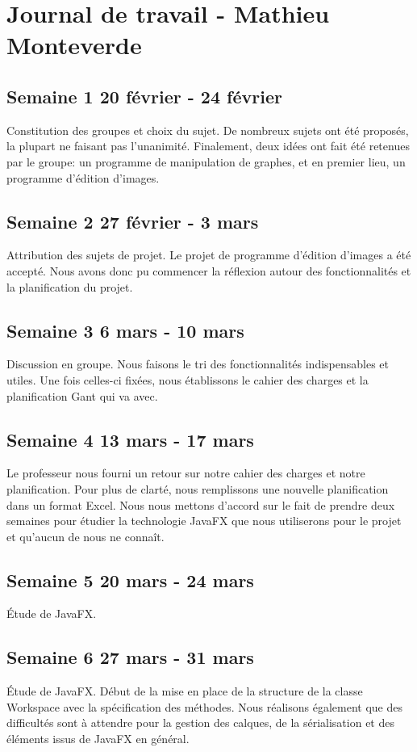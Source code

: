 \section{Journal de travail - Mathieu Monteverde}

\subsection{Semaine 1 20 février - 24 février}
Constitution des groupes et choix du sujet. De nombreux sujets ont été proposés, la plupart ne faisant pas l'unanimité. Finalement, deux idées ont fait été retenues par le groupe: un programme de manipulation de graphes, et en premier lieu, un programme d'édition d'images.
\subsection{Semaine 2 27 février - 3 mars}
Attribution des sujets de projet. Le projet de programme d'édition d'images a été accepté. Nous avons donc pu commencer la réflexion autour des fonctionnalités et la planification du projet.
\subsection{Semaine 3 6 mars - 10 mars}
Discussion en groupe. Nous faisons le tri des fonctionnalités indispensables et utiles. Une fois celles-ci fixées, nous établissons le cahier des charges et la planification Gant qui va avec.
\subsection{Semaine 4 13 mars - 17 mars}
Le professeur nous fourni un retour sur notre cahier des charges et notre planification. Pour plus de clarté, nous remplissons une nouvelle planification dans un format Excel. Nous nous mettons d'accord sur le fait de prendre deux semaines pour étudier la technologie JavaFX que nous utiliserons pour le projet et qu'aucun de nous ne connaît.
\subsection{Semaine 5 20 mars - 24 mars}
Étude de JavaFX.
\subsection{Semaine 6 27 mars - 31 mars}
Étude de JavaFX. Début de la mise en place de la structure de la classe Workspace avec la spécification des méthodes. Nous réalisons également que des difficultés sont à attendre pour la gestion des calques, de la sérialisation et des éléments issus de JavaFX en général.
